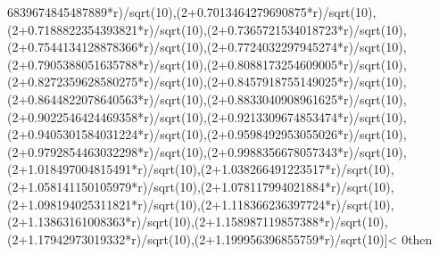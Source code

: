 \documentclass[a4paper,10pt]{article}
\begin{document}
\begin{eulernotebook}
\begin{eulercomment}
\begin{eulercomment}
\begin{eulercomment}
\begin{eulercomment}
\begin{eulercomment}
\begin{eulercomment}
\begin{eulercomment}
\begin{eulercomment}
\begin{eulercomment}
\begin{eulercomment}
\begin{eulercomment}
\begin{eulercomment}
\begin{eulercomment}
\begin{eulercomment}
\begin{eulercomment}
\begin{eulercomment}
\begin{euleroutput}
6839674845487889*r)/sqrt(10),(2+0.7013464279690875*r)/sqrt(10),(2+0.7188822354393821*r)/sqrt(10),(2+0.7365721534018723*r)/sqrt(10),(2+0.7544134128878366*r)/sqrt(10),(2+0.7724032297945274*r)/sqrt(10),(2+0.7905388051635788*r)/sqrt(10),(2+0.8088173254609005*r)/sqrt(10),(2+0.8272359628580275*r)/sqrt(10),(2+0.8457918755149025*r)/sqrt(10),(2+0.8644822078640563*r)/sqrt(10),(2+0.8833040908961625*r)/sqrt(10),(2+0.9022546424469358*r)/sqrt(10),(2+0.9213309674853474*r)/sqrt(10),(2+0.9405301584031224*r)/sqrt(10),(2+0.9598492953055026*r)/sqrt(10),(2+0.9792854463032298*r)/sqrt(10),(2+0.9988356678057343*r)/sqrt(10),(2+1.018497004815491*r)/sqrt(10),(2+1.038266491223517*r)/sqrt(10),(2+1.058141150105979*r)/sqrt(10),(2+1.078117994021884*r)/sqrt(10),(2+1.098194025311821*r)/sqrt(10),(2+1.118366236397724*r)/sqrt(10),(2+1.13863161008363*r)/sqrt(10),(2+1.158987119857388*r)/sqrt(10),(2+1.17942973019332*r)/sqrt(10),(2+1.199956396855759*r)/sqrt(10)]< 0then 
\end{euleroutput}
\end{eulercomment}
\end{eulercomment}
\end{eulercomment}
\end{eulercomment}
\end{eulercomment}
\end{eulercomment}
\end{eulercomment}
\end{eulercomment}
\end{eulercomment}
\end{eulercomment}
\end{eulercomment}
\end{eulercomment}
\end{eulercomment}
\end{eulercomment}
\end{eulercomment}
\end{eulercomment}
\end{eulernotebook}
\end{document}
